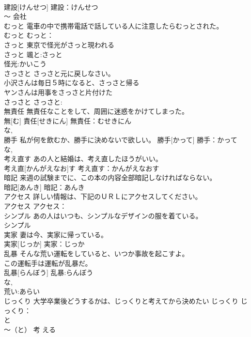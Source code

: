 \documentclass[8pt]{extreport}
\begin{document}
\begin{CJK}{UTF8}{min}
\\	建設[けんせつ]			建設：けんせつ
\\	〜 会社 
\\	むっと	電車の中で携帯電話で話している人に注意したらむっとされた。 
\\	むっと			むっと：
\\	さっと	東京で怪光がさっと現われる 
\\	さっと			颯と:さっと
\\	怪光:かいこう
\\	さっさと	さっさと元に戻しなさい。 
\\	小沢さんは毎日５時になると、さっさと帰る 
\\	ヤンさんは用事をさっさと片付けた 
\\	さっさと			さっさと:
\\	無責任	無責任なことをして、周囲に迷惑をかけてしまった。 
\\	無[む] 責任[せきにん]			無責任：むせきにん
\\	な, 
\\	勝手	私が何を飲むか、勝手に決めないで欲しい。	勝手[かって]			勝手：かって
\\	な, 
\\	考え直す	あの人と結婚は、考え直したほうがいい。 
\\	考え直[かんがえなお]す			考え直す：かんがえなおす
\\	暗記	来週の試験までに、この本の内容全部暗記しなければならない。 
\\	暗記[あんき]			暗記：あんき
\\	アクセス	詳しい情報は、下記のＵＲＬにアクセスしてください。 
\\	アクセス			アクセス：
\\	シンプル	あの人はいつも、シンプルなデザインの服を着ている。 
\\	シンプル			
\\	実家	妻は今、実家に帰っている。 
\\	実家[じっか]			実家：じっか
\\	乱暴	そんな荒い運転をしていると、いつか事故を起こすよ。 
\\	この運転手は運転が乱暴だ。 
\\	乱暴[らんぼう]			乱暴:らんぼう
\\	な, 
\\	荒い:あらい
\\	じっくり	大学卒業後どうするかは、じっくりと考えてから決めたい	じっくり			じっくり：
\\	と 
\\	〜（と） 考 える			

\end{CJK}
\end{document}

